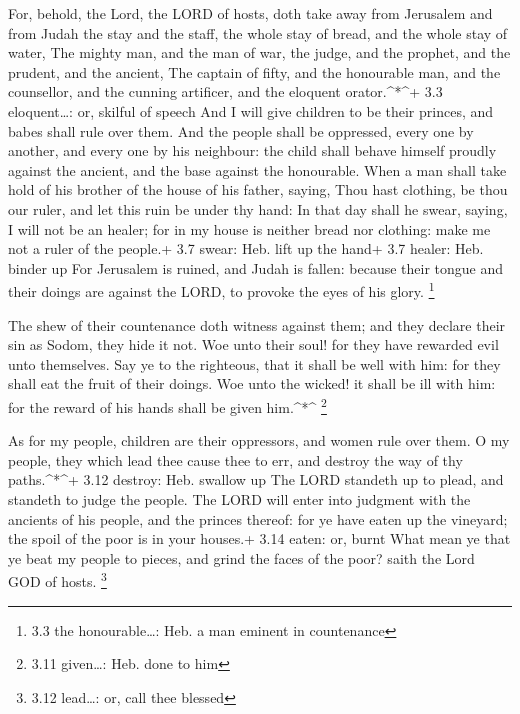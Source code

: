  For, behold, the Lord, the LORD of hosts, doth take away
from Jerusalem and from Judah the stay and the staff, the whole stay of
bread, and the whole stay of water,  The mighty man, and the
man of war, the judge, and the prophet, and the prudent, and the
ancient,  The captain of fifty, and the honourable man, and
the counsellor, and the cunning artificer, and the eloquent
orator.\^{}*\^{}+ 3.3 eloquent\ldots: or, skilful of speech 
And I will give children to be their princes, and babes shall rule over
them.  And the people shall be oppressed, every one by
another, and every one by his neighbour: the child shall behave himself
proudly against the ancient, and the base against the honourable.
 When a man shall take hold of his brother of the house of
his father, saying, Thou hast clothing, be thou our ruler, and let this
ruin be under thy hand:  In that day shall he swear, saying,
I will not be an healer; for in my house is neither bread nor clothing:
make me not a ruler of the people.+ 3.7 swear: Heb. lift up the hand+
3.7 healer: Heb. binder up  For Jerusalem is ruined, and
Judah is fallen: because their tongue and their doings are against the
LORD, to provoke the eyes of his glory. \footnote{3.3 the
  honourable\ldots: Heb. a man eminent in countenance}

 The shew of their countenance doth witness against them;
and they declare their sin as Sodom, they hide it not. Woe unto their
soul! for they have rewarded evil unto themselves.  Say ye
to the righteous, that it shall be well with him: for they shall eat the
fruit of their doings.  Woe unto the wicked! it shall be
ill with him: for the reward of his hands shall be given him.\^{}*\^{}
\footnote{3.11 given\ldots: Heb. done to him}

 As for my people, children are their oppressors, and women
rule over them. O my people, they which lead thee cause thee to err, and
destroy the way of thy paths.\^{}*\^{}+ 3.12 destroy: Heb. swallow up
 The LORD standeth up to plead, and standeth to judge the
people.  The LORD will enter into judgment with the
ancients of his people, and the princes thereof: for ye have eaten up
the vineyard; the spoil of the poor is in your houses.+ 3.14 eaten: or,
burnt  What mean ye that ye beat my people to pieces, and
grind the faces of the poor? saith the Lord GOD of hosts. \footnote{3.12
  lead\ldots: or, call thee blessed}

